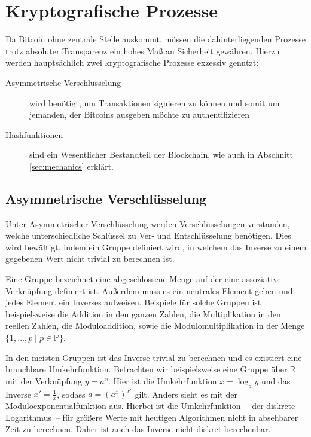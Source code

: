\section{Kryptografische Prozesse}

Da Bitcoin ohne zentrale Stelle auskommt, müssen die dahinterliegenden Prozesse trotz absoluter Transparenz ein hohes Maß an Sicherheit gewähren.
Hierzu werden hauptsächlich zwei kryptografische Prozesse exzessiv genutzt:
\begin{description}
    \item[Asymmetrische Verschlüsselung] wird benötigt, um Transaktionen signieren zu können und somit um jemanden, der Bitcoins ausgeben möchte zu authentifizieren
    \item[Hashfunktionen] sind ein Wesentlicher Bestandteil der Blockchain, wie auch in Abschnitt \ref{sec:mechanics} erklärt.
\end{description}

\subsection{Asymmetrische Verschlüsselung}

Unter Asymmetrischer Verschlüsselung werden Verschlüsselungen verstanden, welche unterschiedliche Schlüssel zu Ver- und Entschlüsselung benötigen.
Dies wird bewältigt, indem ein Gruppe definiert wird, in welchem das Inverse zu einem gegebenen Wert nicht trivial zu berechnen ist.

Eine Gruppe bezeichnet eine abgeschlossene Menge auf der eine assoziative Verknüpfung definiert ist.
Außerdem muss es ein neutrales Element geben und jedes Element ein Inverses aufweisen.
Beispiele für solche Gruppen ist beispielsweise die Addition in den ganzen Zahlen, die Multiplikation in den reellen Zahlen, die Moduloaddition, sowie die Modulomultiplikation in der Menge $\{ 1, \dotsc, p \mid p \in \mathbb{P}\}$.

In den meisten Gruppen ist das Inverse trivial zu berechnen und es existiert eine brauchbare Umkehrfunktion.
Betrachten wir beispielsweise eine Gruppe über $\mathbb{R}$ mit der Verknüpfung $y=a^x$.
Hier ist die Umkehrfunktion $x=\log_a y$ und das Inverse $x'=\frac{1}{x}$, sodass $a=(a^x)^{x'}$ gilt.
Anders sieht es mit der Moduloexponentialfunktion aus.
Hierbei ist die Umkehrfunktion --~der diskrete Logarithmus~-- für größere Werte mit heutigen Algorithmen nicht in absehbarer Zeit zu berechnen.
Daher ist auch das Inverse nicht diskret berechenbar.

